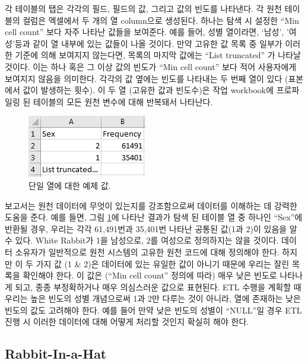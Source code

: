 \documentclass[10.5pt]{book}
\theoremstyle{definition}
\theoremstyle{definition}
\theoremstyle{definition}
\theoremstyle{remark}
\begin{document}
각 테이블의 탭은 각각의 필드, 필드의 값, 그리고 값의 빈도를 나타낸다. 각
원천 테이블의 컬럼은 엑셀에서 두 개의 열 column으로 생성된다. 하나는
탐색 시 설정한 ``Min cell count'' 보다 자주 나타난 값들을 보여준다. 예를
들어, 성별 열이라면, `남성', '여성'등과 같이 열 내부에 있는 값들이 나올
것이다. 만약 고유한 값 목록 중 일부가 이러한 기준에 의해 보여지지
않는다면, 목록의 마지막 값에는 ``List truncated'' 가 나타날 것이다. 이는
하나 혹은 그 이상 값의 빈도가 ``Min cell count'' 보다 적어 사용자에게
보여지지 않음을 의미한다. 각각의 값 옆에는 빈도를 나타내는 두 번째 열이
있다 (표본에서 값이 발생하는 횟수). 이 두 열 (고유한 값과 빈도수)은 작업
workbook에 프로파일링 된 테이블의 모든 원천 변수에 대해 반복돼서
나타난다.

\begin{figure}

{\centering \includegraphics[width=0.3\linewidth]{images/ExtractTransformLoad/ScanSex} 

}

\caption{단일 열에 대한 예제 값.}\label{fig:scanSex}
\end{figure}

보고서는 원천 데이터에 무엇이 있는지를 강조함으로써 데이터를 이해하는 데
강력한 도움을 준다. 예를 들면, 그림 \ref{fig:scanSex}에 나타난 결과가
탐색 된 테이블 열 중 하나인 ``Sex''에 반환될 경우, 우리는 각각
61,491번과 35,401번 나타난 공통된 값(1과 2)이 있음을 알 수 있다. White
Rabbit가 1을 남성으로, 2를 여성으로 정의하지는 않을 것이다. 데이터
소유자가 일반적으로 원천 시스템의 고유한 원천 코드에 대해 정의해야 한다.
하지만 이 두 가지 값 (1 \& 2)은 데이터에 있는 유일한 값이 아니기 때문에
우리는 잘린 목록을 확인해야 한다. 이 값은 (``Min cell count'' 정의에
따라) 매우 낮은 빈도로 나타나게 되고, 종종 부정확하거나 매우 의심스러운
값으로 표현된다. ETL 수행을 계획할 때 우리는 높은 빈도의 성별 개념으로써
1과 2만 다루는 것이 아니라, 열에 존재하는 낮은 빈도의 값도 고려해야
한다. 예를 들어 만약 낮은 빈도의 성별이 ``NULL''일 경우 ETL 진행 시
이러한 데이터에 대해 어떻게 처리할 것인지 확실히 해야 한다.

\subsection{Rabbit-In-a-Hat}\label{rabbit-in-a-hat}
\end{document}
